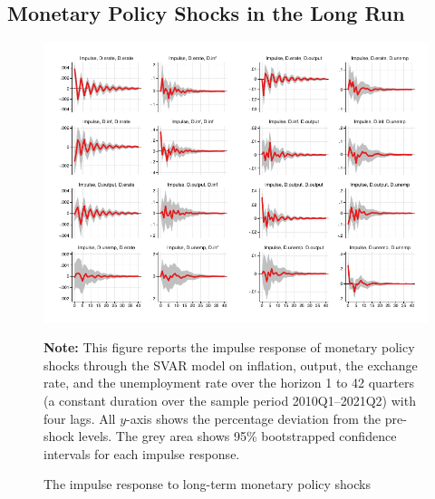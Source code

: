 \documentclass[11pt,letterpaper]{article}
\begin{document}
	\subsection{Monetary Policy Shocks in the Long Run}
\begin{figure}[H]
	\centering
	\caption{The impulse response to long-term monetary policy shocks}
	\label{fig:lsvar1}
	\includegraphics[width=1\linewidth]{../../empirical/Marcodata/Graphs/impulse_svar1}
		\begin{tablenotes}
		\footnotesize
		\item \textbf{Note:} This figure reports the impulse response of monetary policy shocks through the SVAR model on inflation, output, the exchange rate, and the unemployment rate over the horizon 1 to 42 quarters (a constant duration over the sample period 2010Q1–2021Q2) with four lags. All $y$-axis shows the percentage deviation from the pre-shock levels. The grey area shows 95\% bootstrapped confidence intervals for each impulse response.
		
	\end{tablenotes} 
\end{figure}
\end{document}
